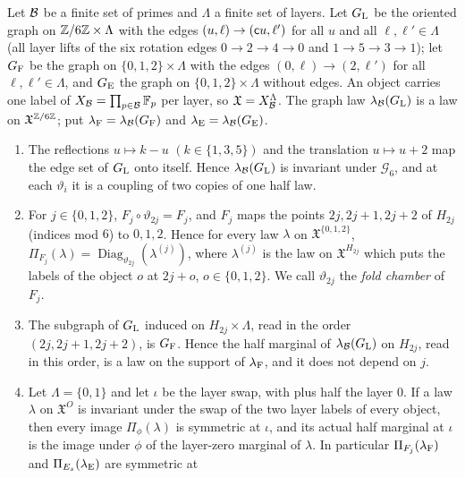 \begin{lemma}\label{lem:record:fold-identification}
Let $\mathcal B$ be a finite set of primes and $\Lambda$ a finite set of layers. Let
$G_{\rm L}$ be the oriented graph on $\mathbb Z/6\mathbb Z\times\Lambda$ with the edges
$(u,\ell)\to(\mathsf c u,\ell')$ for all $u$ and all $\ell,\ell'\in\Lambda$ (all layer
lifts of the six rotation edges $0\to2\to4\to0$ and $1\to5\to3\to1$); let
$G_{\rm F}$ be the graph on $\{0,1,2\}\times\Lambda$ with the
edges $(0,\ell)\to(2,\ell')$ for all $\ell,\ell'\in\Lambda$,
and $G_{\rm E}$ the graph on $\{0,1,2\}\times\Lambda$
without edges. An object carries one label of $X_{\mathcal B}=\prod_{p\in\mathcal B}\mathbb F_p$ per
layer, so $\mathfrak X=X_{\mathcal B}^\Lambda$. The graph law $\lambda_{\mathcal B}(G_{\rm L})$ is a law on
$\mathfrak X^{\mathbb Z/6\mathbb Z}$; put $\lambda_{\rm F}=\lambda_{\mathcal B}(G_{\rm F})$ and
$\lambda_{\rm E}=\lambda_{\mathcal B}(G_{\rm E})$.
\begin{enumerate}[label=\textup{(\alph*)}]
\item The reflections $u\mapsto k-u$ $(k\in\{1,3,5\})$ and the translation
 $u\mapsto u+2$ map the edge set of $G_{\rm L}$ onto itself. Hence $\lambda_{\mathcal B}(G_{\rm L})$ is invariant under $\mathcal G_6$, and at each $\vartheta_i$ it is a coupling
 of two copies of one half law.
\item For $j\in\{0,1,2\}$, $F_j\circ\vartheta_{2j}=F_j$, and $F_j$ maps the
 points $2j,2j+1,2j+2$ of $H_{2j}$ (indices mod $6$) to $0,1,2$. Hence for every
 law $\lambda$ on $\mathfrak X^{\{0,1,2\}}$,
 $\Pi_{F_j}(\lambda)=\operatorname{Diag}_{\vartheta_{2j}}(\lambda^{(j)})$, where
 $\lambda^{(j)}$ is the law on $\mathfrak X^{H_{2j}}$ which puts the labels of the
 object $o$ at $2j+o$, $o\in\{0,1,2\}$. We call $\vartheta_{2j}$ the
 \emph{fold chamber} of $F_j$.
\item The subgraph of $G_{\rm L}$ induced on $H_{2j}\times\Lambda$, read in the
 order $(2j,2j+1,2j+2)$, is $G_{\rm F}$. Hence the half marginal of
 $\lambda_{\mathcal B}(G_{\rm L})$ on $H_{2j}$, read in this order, is a law on the support of
 $\lambda_{\rm F}$, and it does not depend on $j$.
\item Let $\Lambda=\{0,1\}$ and let $\iota$ be the layer swap, with plus half the
 layer $0$. If a law $\lambda$ on $\mathfrak X^O$ is invariant under the swap of
 the two layer labels of every object, then every image $\Pi_\phi(\lambda)$ is
 symmetric at $\iota$, and its actual half marginal at $\iota$ is the image
 under $\phi$ of the layer-zero marginal of $\lambda$. In particular
 $\Pi_{F_j}(\lambda_{\rm F})$ and $\Pi_{E_s}(\lambda_{\rm E})$ are symmetric at

\end{enumerate}
\end{lemma}
